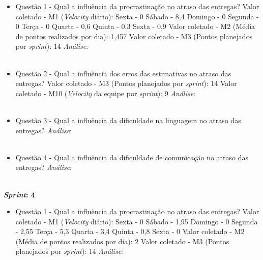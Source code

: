 \begin{apendicesenv}
\begin{itemize}
	  \item Questão 1 - Qual a influência da procrastinação no atraso das entregas?
	    \subitem Valor coletado - M1 (\textit{Velocity} diário):
	      \subsubitem Sexta - 0
	      \subsubitem Sábado - 8,4
	      \subsubitem Domingo - 0
	      \subsubitem Segunda - 0
	      \subsubitem Terça - 0
	      \subsubitem Quarta - 0,6
	      \subsubitem Quinta - 0,3
	      \subsubitem Sexta - 0,9
	    \subitem Valor coletado - M2 (Média de pontos realizados por dia): 1,457
	    \subitem Valor coletado - M3 (Pontos planejados por \textit{sprint}): 14
	    \subitem \textit{Análise}: 
	    \\
	    \\

	  \item Questão 2 - Qual a influência dos erros das estimativas no atraso das entregas? 
	    \subitem Valor coletado - M3 (Pontos planejados por \textit{sprint}): 14
	    \subitem Valor coletado - M10 (\textit{Velocity} da equipe por \textit{sprint}): 9
	    \subitem \textit{Análise}:
	    \\
	    \\
	    
	  \item Questão 3 - Qual a influência da dificuldade na linguagem no atraso das entregas?
	    \subitem \textit{Análise}:
	  \\
	  \\
	  
	  \item Questão 4 - Qual a influência da dificuldade de comunicação no atraso das entregas?
	    \subitem \textit{Análise}:
	  \\
	  \\
	  
	\end{itemize}
	    \vfill
	    \pagebreak
	\textbf{\textit{Sprint}: 4}
	
	\begin{itemize}
	  
	  \item Questão 1 - Qual a influência da procrastinação no atraso das entregas?
	    \subitem Valor coletado - M1 (\textit{Velocity} diário):
	      \subsubitem Sexta - 0
	      \subsubitem Sábado - 1,95
	      \subsubitem Domingo - 0
	      \subsubitem Segunda - 2,55
	      \subsubitem Terça - 5,3
	      \subsubitem Quarta - 3,4
	      \subsubitem Quinta - 0,8
	      \subsubitem Sexta - 0
	    \subitem Valor coletado - M2 (Média de pontos realizados por dia): 2
	    \subitem Valor coletado - M3 (Pontos planejados por \textit{sprint}): 14
	    \subitem \textit{Análise}:
	    \\
	    \\


\end{itemize}
\end{apendicesenv}
